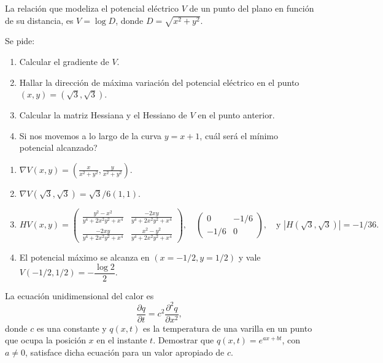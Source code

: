 {La relación que modeliza el potencial eléctrico $V$ de un punto del plano en función de su distancia, es $V=\log D$, donde $D=\sqrt{x^2+y^2}$.

Se pide:
\begin{enumerate}
\item Calcular el gradiente de $V$.
\item Hallar la dirección de máxima variación del potencial
eléctrico en el punto $(x,y)=(\sqrt{3},\sqrt{3})$.
\item Calcular la matriz Hessiana y el Hessiano de $V$ en el punto anterior.
\item Si nos movemos a lo largo de la curva $y=x+1$, cuál será el mínimo potencial alcanzado?
\end{enumerate}
}
{\begin{enumerate}
\item $\nabla V(x,y) = \left( \frac{x}{x^2+y^2},\frac{y}{x^2+y^2}\right)$.
\item $\nabla V(\sqrt 3, \sqrt 3) = \sqrt 3 /6(1,1)$.
\item $
HV(x,y) = \left(
\begin{array}{cc}
\frac{y^2-x^2}{y^4+2x^2y^2+x^4} & \frac{-2xy}{y^4+2x^2y^2+x^4} \\
\frac{-2xy}{y^4+2x^2y^2+x^4} & \frac{x^2-y^2}{y^4+2x^2y^2+x^4}
\end{array}
\right),\quad
\left(
\begin{array}{cc}
0 & -1/6 \\
-1/6 & 0
\end{array}
\right),\quad \mbox{y }
|H(\sqrt 3,\sqrt 3)| = -1/36.
$
\item El potencial máximo se alcanza en $(x=-1/2, y=1/2)$ y vale $V(-1/2,1/2) = -\dfrac{\log 2}{2}$.
\end{enumerate}
}
{
}


{La ecuación unidimensional del calor es
\[
\frac{\partial q}{\partial t}=c^2\frac{\partial^2q}{\partial x^2},
\]
donde $c$ es una constante y $q(x,t)$ es la temperatura de una varilla en un punto que ocupa la posición $x$ en el instante $t$. Demostrar que $q(x,t)=e^{ax+bt}$, con $a\neq 0$, satisface dicha ecuación para un valor apropiado de $c$.
}


